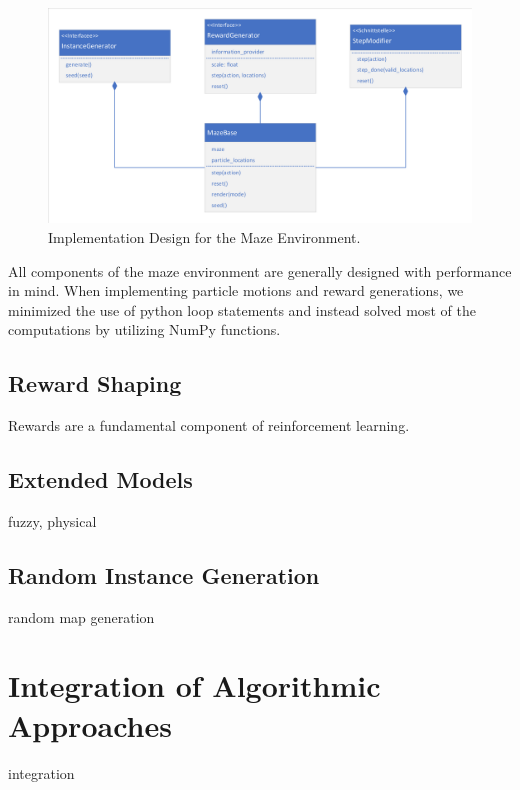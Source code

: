 \begin{figure}[ht]
    
    \begin{center}
        \includegraphics[clip, trim=10px 10px 10px 10px, width=0.9\columnwidth]{figures/implementation/maze_base_design.pdf}
    \end{center}
    
    \caption[Implementation Design for the Maze Environment]{Implementation Design for the Maze Environment.}
    \label{fig:MazeBaseDesign}
  \end{figure}

All components of the maze environment are generally designed with performance in mind. When implementing particle motions and reward generations, we minimized the use of python loop statements and instead solved most of the computations by utilizing NumPy \cite{oliphant2006guide} functions.

\subsection{Reward Shaping} \label{sec:MazeReward}
Rewards are a fundamental component of reinforcement learning. 

\subsection{Extended Models} \label{sec:ExtendedMaze}
fuzzy, physical 

\subsection{Random Instance Generation} \label{sec:RandomInstanceGeneration}
random map generation

\section{Integration of Algorithmic Approaches} \label{sec:AlgorithmIntegration}
integration


